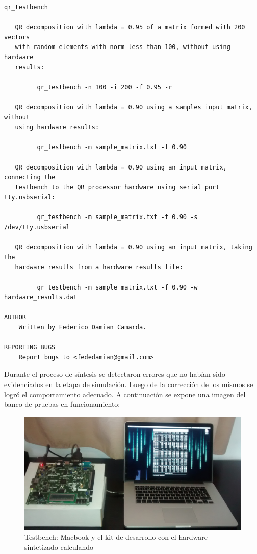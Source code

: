 \begin{lstlisting}[style=C]
         qr_testbench
    
   QR decomposition with lambda = 0.95 of a matrix formed with 200 vectors
   with random elements with norm less than 100, without using hardware
   results:

         qr_testbench -n 100 -i 200 -f 0.95 -r
    
   QR decomposition with lambda = 0.90 using a samples input matrix, without
   using hardware results:
   
         qr_testbench -m sample_matrix.txt -f 0.90
   
   QR decomposition with lambda = 0.90 using an input matrix, connecting the
   testbench to the QR processor hardware using serial port tty.usbserial:
   
         qr_testbench -m sample_matrix.txt -f 0.90 -s /dev/tty.usbserial

   QR decomposition with lambda = 0.90 using an input matrix, taking the
   hardware results from a hardware results file:
   
         qr_testbench -m sample_matrix.txt -f 0.90 -w hardware_results.dat
   
AUTHOR
    Written by Federico Damian Camarda.

REPORTING BUGS
    Report bugs to <fededamian@gmail.com>
\end{lstlisting}

Durante el proceso de síntesis se detectaron errores que no habían sido evidenciados en la etapa de simulación. Luego de la corrección de los mismos se logró el comportamiento adecuado. A continuación se expone una imagen del banco de pruebas en funcionamiento:

\begin{figure}[!h]
  \begin{center}
    \includegraphics[width=\textwidth]{./figures/C05-mac_vs_kit}
    \caption{Testbench: Macbook y el kit de desarrollo con el hardware sintetizado calculando}
    \label{fig:mac_vs_kit}
  \end{center}
\end{figure}

